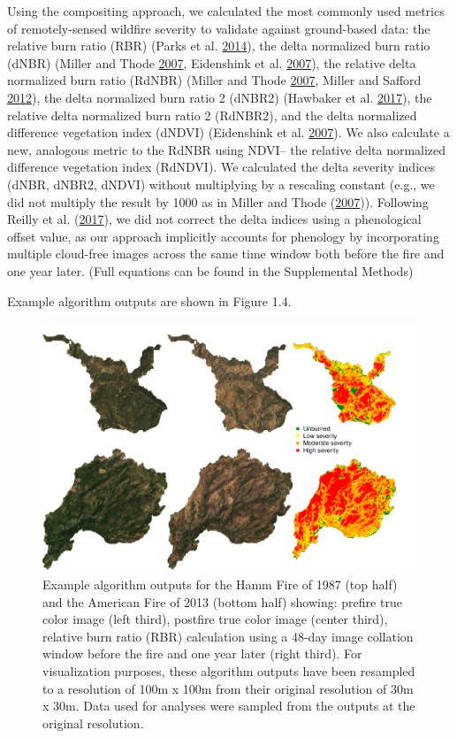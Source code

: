 \documentclass[twoside,12pt,final]{ucthesis-CA2012}
\begin{document}
\begin{ucmainmatter}
Using the compositing approach, we calculated the most commonly used
metrics of remotely-sensed wildfire severity to validate against
ground-based data: the relative burn ratio (RBR) (Parks et al.
\protect\hyperlink{ref-parks2014a}{2014}), the delta normalized burn
ratio (dNBR) (Miller and Thode \protect\hyperlink{ref-miller2007}{2007},
Eidenshink et al. \protect\hyperlink{ref-eidenshink2007}{2007}), the
relative delta normalized burn ratio (RdNBR) (Miller and Thode
\protect\hyperlink{ref-miller2007}{2007}, Miller and Safford
\protect\hyperlink{ref-miller2012a}{2012}), the delta normalized burn
ratio 2 (dNBR2) (Hawbaker et al.
\protect\hyperlink{ref-hawbaker2017}{2017}), the relative delta
normalized burn ratio 2 (RdNBR2), and the delta normalized difference
vegetation index (dNDVI) (Eidenshink et al.
\protect\hyperlink{ref-eidenshink2007}{2007}). We also calculate a new,
analogous metric to the RdNBR using NDVI-- the relative delta normalized
difference vegetation index (RdNDVI). We calculated the delta severity
indices (dNBR, dNBR2, dNDVI) without multiplying by a rescaling constant
(e.g., we did not multiply the result by 1000 as in Miller and Thode
(\protect\hyperlink{ref-miller2007}{2007})). Following Reilly et al.
(\protect\hyperlink{ref-reilly2017}{2017}), we did not correct the delta
indices using a phenological offset value, as our approach implicitly
accounts for phenology by incorporating multiple cloud-free images
across the same time window both before the fire and one year later.
(Full equations can be found in the Supplemental Methods)

Example algorithm outputs are shown in Figure 1.4.
\begin{figure}
\centering
\includegraphics[width=6.00000in]{figure/chap01/pre-post-rbr.pdf}
\caption{Example algorithm outputs for the Hamm Fire of 1987 (top half)
and the American Fire of 2013 (bottom half) showing: prefire true color
image (left third), postfire true color image (center third), relative
burn ratio (RBR) calculation using a 48-day image collation window
before the fire and one year later (right third). For visualization
purposes, these algorithm outputs have been resampled to a resolution of
100m x 100m from their original resolution of 30m x 30m. Data used for
analyses were sampled from the outputs at the original resolution.}
\end{figure}

\end{ucmainmatter}
\end{document}
